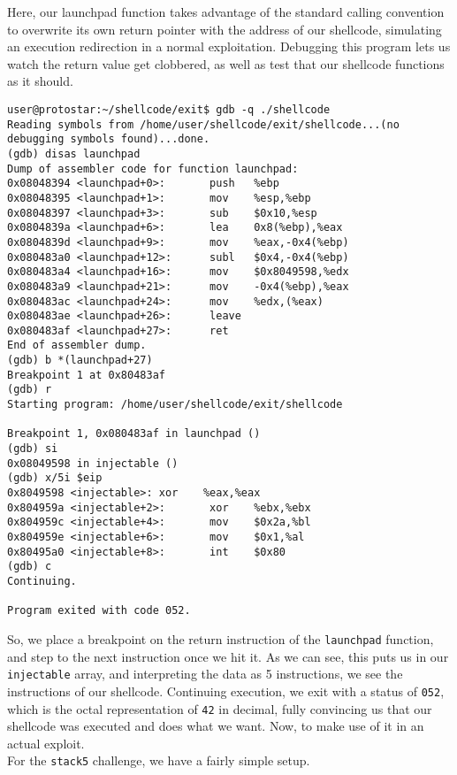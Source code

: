 Here, our launchpad function takes advantage of the standard calling convention to overwrite its own
return pointer with the address of our shellcode, simulating an execution redirection in
a normal exploitation. Debugging this program lets us watch the return value get clobbered, as
well as test that our shellcode functions as it should.

\begin{lstlisting}
user@protostar:~/shellcode/exit$ gdb -q ./shellcode
Reading symbols from /home/user/shellcode/exit/shellcode...(no debugging symbols found)...done.
(gdb) disas launchpad
Dump of assembler code for function launchpad:
0x08048394 <launchpad+0>:       push   %ebp
0x08048395 <launchpad+1>:       mov    %esp,%ebp
0x08048397 <launchpad+3>:       sub    $0x10,%esp
0x0804839a <launchpad+6>:       lea    0x8(%ebp),%eax
0x0804839d <launchpad+9>:       mov    %eax,-0x4(%ebp)
0x080483a0 <launchpad+12>:      subl   $0x4,-0x4(%ebp)
0x080483a4 <launchpad+16>:      mov    $0x8049598,%edx
0x080483a9 <launchpad+21>:      mov    -0x4(%ebp),%eax
0x080483ac <launchpad+24>:      mov    %edx,(%eax)
0x080483ae <launchpad+26>:      leave  
0x080483af <launchpad+27>:      ret    
End of assembler dump.
(gdb) b *(launchpad+27)
Breakpoint 1 at 0x80483af
(gdb) r
Starting program: /home/user/shellcode/exit/shellcode 

Breakpoint 1, 0x080483af in launchpad ()
(gdb) si
0x08049598 in injectable ()
(gdb) x/5i $eip
0x8049598 <injectable>: xor    %eax,%eax
0x804959a <injectable+2>:       xor    %ebx,%ebx
0x804959c <injectable+4>:       mov    $0x2a,%bl
0x804959e <injectable+6>:       mov    $0x1,%al
0x80495a0 <injectable+8>:       int    $0x80
(gdb) c
Continuing.

Program exited with code 052.
\end{lstlisting}

So, we place a breakpoint on the return instruction of
the \texttt{launchpad} function, and step to the next
instruction once we hit it. As we can see, this puts us
in our \texttt{injectable} array, and interpreting the 
data as 5 instructions, we see the instructions of our shellcode.
Continuing execution, we exit with a status of \texttt{052},
which is the octal representation of \texttt{42} in decimal,
fully convincing us that our shellcode was executed and does
what we want. Now, to make use of it in an actual exploit.\\

For the \texttt{stack5} challenge, we have a fairly simple setup.

